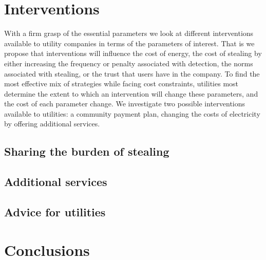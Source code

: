 \documentclass{article}
\begin{document}
\section{Interventions}
With a firm grasp of the essential parameters we look at different interventions available to utility companies in terms of the parameters of interest. That is we propose that interventions will influence the cost of energy, the cost of stealing by either increasing the frequency or penalty associated with detection, the norms associated with stealing, or the trust that users have in the company. To find the most effective mix of strategies while facing cost constraints, utilities most determine the extent to which an intervention will change these parameters, and the cost of each parameter change. We investigate two possible interventions available to utilities: a community payment plan, changing the costs of electricity by offering additional services. 

\subsection{Sharing the burden of stealing}

\subsection{Additional services}

\subsection{Advice for utilities}

\section{Conclusions}
\end{document}
